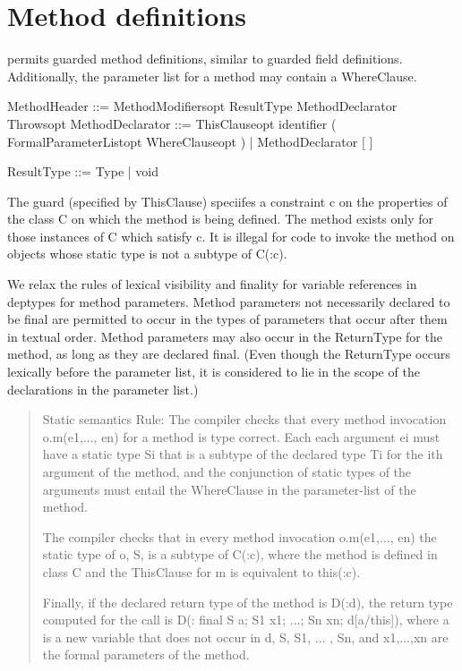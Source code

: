 \section{Method definitions}

\Xten{} permits guarded method definitions, similar to guarded
field definitions. Additionally, the parameter list for a method may
contain a WhereClause.

\begin{x10}
MethodHeader ::= 
  MethodModifiersopt ResultType 
  MethodDeclarator Throwsopt
MethodDeclarator ::= 
  ThisClauseopt identifier 
  ( FormalParameterListopt WhereClauseopt )
 | MethodDeclarator [ ]

ResultType ::= Type | void
\end{x10}

The guard (specified by {\cf ThisClause}) speciifes a constraint {\cf c} on the
properties of the class {\cf C} on which the method is being defined. The
method exists only for those instances of {\cf C} which satisfy {\cf c}.  It is
illegal for code to invoke the method on objects whose static type is
not a subtype of {\cf C(:c)}.

We relax the rules of lexical visibility and finality for variable
references in deptypes for method parameters.  Method
parameters not necessarily declared to be final are permitted to occur
in the types of parameters that occur after them in textual
order. Method parameters may also occur in the ReturnType for the
method, as long as they are declared final. (Even though the ReturnType
occurs lexically before the parameter list, it is considered to lie in
the scope of the declarations in the parameter list.)

\begin{quotation}
 {\sc  Static semantics Rule: }
    The compiler checks that every method invocation {\cf o.m(e1,..., en)}
    for a method is type correct. Each each argument ei must have a
    static type Si that is a subtype of the declared type Ti for the ith
    argument of the method, and the conjunction of static types
    of the arguments must entail the WhereClause in the parameter-list
    of the method.

    The compiler checks that in every method invocation {\cf o.m(e1,...,
    en)} the static type of o, S, is a subtype of C(:c), where the method
    is defined in class C and the ThisClause for m is equivalent to
    {\cf this(:c)}.

    Finally, if the declared return type of the method is D(:d), the
    return type computed for the call is {\cf D(: final S a; S1 x1; ...; Sn
    xn; d[a/this])}, where a is a new variable that does not occur in
    {\cf d, S, S1, ... , Sn}, and {\cf x1,...,xn} are the formal parameters of the
    method.
\end{quotation}

